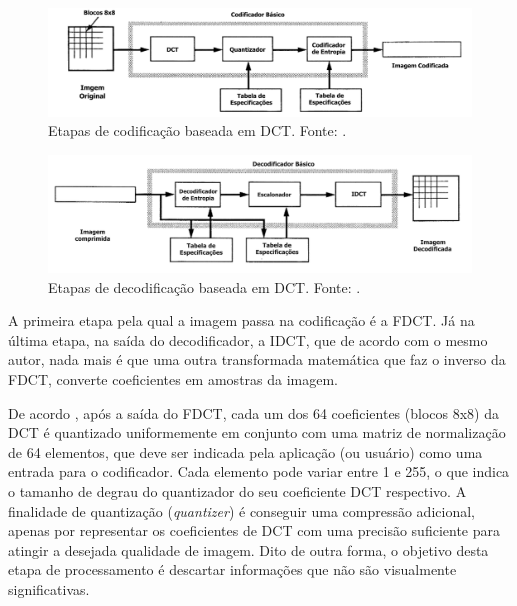 \begin{figure}[h]
	\centering
	\includegraphics[scale=0.55]{figuras/ENCODER-JPEG.pdf}
	\caption{Etapas de codificação baseada em DCT. Fonte: \cite{wallace1991jpeg}.}
	\label{ENCODER_JPEG}
\end{figure}

\begin{figure}[h]
	\centering
	\includegraphics[scale=0.55]{figuras/DECODER-JPEG.pdf}
	\caption{Etapas de decodificação baseada em DCT. Fonte: \cite{wallace1991jpeg}.}
	\label{DECODER_JPEG}
\end{figure}
  
 A primeira etapa pela qual a imagem passa na codificação é a FDCT. Já na última etapa, na saída do decodificador, a IDCT, que de acordo com o mesmo autor, nada mais é que uma outra transformada matemática que faz o inverso da FDCT, converte coeficientes em amostras da imagem. 

De acordo \cite{wallace1991jpeg}, após a saída do FDCT, cada um dos 64 coeficientes (blocos 8x8) da DCT  é quantizado uniformemente em conjunto com uma matriz de normalização de 64 elementos, que deve ser indicada pela aplicação (ou usuário) como uma entrada para o codificador. Cada elemento pode variar entre 1 e 255, o que indica o tamanho de degrau do quantizador do seu coeficiente DCT respectivo. A finalidade de quantização (\textit{quantizer}) é conseguir uma compressão adicional, apenas por representar os coeficientes de DCT com uma precisão suficiente para atingir a desejada qualidade de imagem. Dito de outra forma, o objetivo desta etapa de processamento é descartar informações que não são visualmente significativas. 

